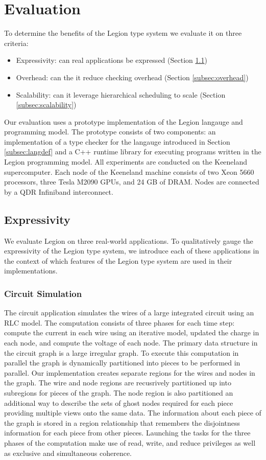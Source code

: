 
\section{Evaluation}
\label{sec:evaluation}

To determine the benefits of the Legion type system we evaluate
it on three criteria:
\begin{itemize}
\item Expressivity: can real applications be expressed (Section \ref{subsec:expressivity})
\item Overhead: can the it reduce checking overhead (Section \ref{subsec:overhead})
\item Scalability: can it leverage hierarchical scheduling to scale (Section \ref{subsec:scalability})
\end{itemize}
Our evaluation uses a prototype implementation of the Legion langauge and programming model.
The prototype consists of two components: an implementation of a type checker
for the langauge introduced in Section \ref{subsec:langdef} and a C++ runtime library
for executing programs written in the Legion programming model\cite{Legion12}.  All experiments
are conducted on the Keeneland supercomputer\cite{Keeneland}.  Each node of the Keeneland
machine consists of two Xeon 5660 processors, three Tesla M2090 GPUs, and 24 GB of DRAM.  Nodes
are connected by a QDR Infiniband interconnect.

\subsection{Expressivity}
\label{subsec:expressivity}
We evaluate Legion on three real-world applications.  To qualitatively gauge the 
expressivity of the Legion type system, we introduce each of these applications in
the context of which features of the Legion type system are used in their implementations.

\subsubsection{Circuit Simulation}
\label{subsec:circuit}
The circuit application simulates the wires of a large integrated circuit using an RLC
model.  The computation consists of three phases for each time step: compute the current in each wire using
an iterative model, updated the charge in each node, and compute the voltage of each node.
The primary data structure in the circuit graph is a large irregular graph.  To execute
this computation in parallel the graph is dynamically partitioned into pieces to be
performed in parallel.  Our implementation creates separate regions for the wires and
nodes in the graph.  The wire and node regions are recusrively partitioned up into
subregions for pieces of the graph.  The node region is also partitioned an additional way to 
describe the sets of ghost nodes required for each piece providing multiple views onto the
same data.  The information about each piece of the graph is stored
in a region relationship that remembers the disjointness information for each piece
from other pieces.  Launching the tasks for the three phases of the computation make 
use of read, write, and reduce privileges as well as exclusive and simultaneous coherence.

